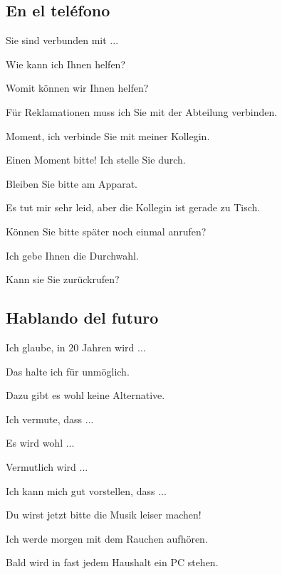 \subsection{En el teléfono}
\begin{myitemize}
\item Sie sind verbunden mit ...
\item Wie kann ich Ihnen helfen?
\item Womit können wir Ihnen helfen?
\item Für Reklamationen muss ich Sie mit der Abteilung verbinden.
\item Moment, ich verbinde Sie mit meiner Kollegin.
\item Einen Moment bitte! Ich stelle Sie durch.
\item Bleiben Sie bitte am Apparat.
\item Es tut mir sehr leid, aber die Kollegin ist gerade zu Tisch.
\item Können Sie bitte später noch einmal anrufen?
\item Ich gebe Ihnen die Durchwahl.
\item Kann sie Sie zurückrufen?
\end{myitemize}

\subsection{Hablando del futuro}
\begin{myitemize}
\item Ich glaube, in 20 Jahren wird ...
\item Das halte ich für unmöglich.
\item Dazu gibt es wohl keine Alternative.
\item Ich vermute, dass ...
\item Es wird wohl ...
\item Vermutlich wird ...
\item Ich kann mich gut vorstellen, dass ...
\item Du wirst jetzt bitte die Musik leiser machen!
\item Ich werde morgen mit dem Rauchen aufhören.
\item Bald wird in fast jedem Haushalt ein PC stehen.
\end{myitemize}

